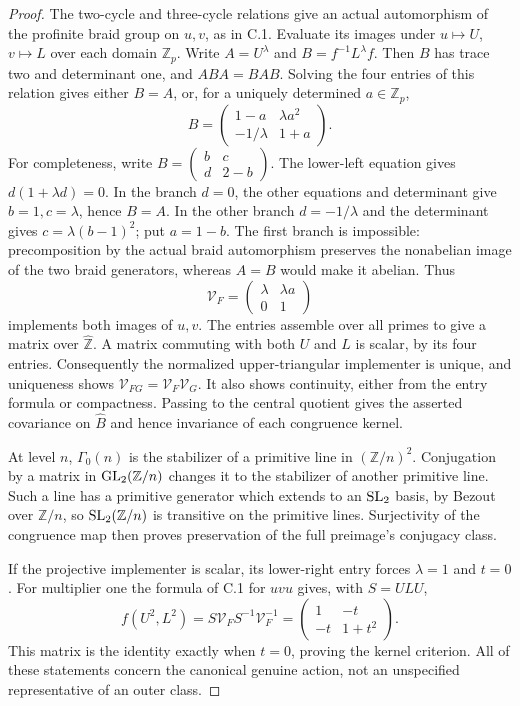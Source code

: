 \begin{proof}
The two-cycle and three-cycle relations give an actual automorphism
of the profinite braid group on $u,v$, as in C.1. Evaluate its
images under $u\mapsto U$, $v\mapsto L$ over each domain
$\mathbb Z_p$. Write $A=U^\lambda$ and $B=f^{-1}L^\lambda f$.
Then $B$ has trace two and determinant one, and $ABA=BAB$.
Solving the four entries of this relation gives either $B=A$,
or, for a uniquely determined $a\in\mathbb Z_p$,
\[
 B=\begin{pmatrix}1-a&\lambda a^2\\
                  -1/\lambda&1+a\end{pmatrix}.
\]
For completeness, write $B=\left(\begin{smallmatrix}b&c\\d&2-b\end{smallmatrix}\right)$.
The lower-left equation gives $d(1+\lambda d)=0$.
In the branch $d=0$, the other equations and determinant give
$b=1,c=\lambda$, hence $B=A$. In the other branch
$d=-1/\lambda$ and the determinant gives
$c=\lambda(b-1)^2$; put $a=1-b$.
The first branch is impossible: precomposition by the actual braid
automorphism preserves the nonabelian image of the two braid
generators, whereas $A=B$ would make it abelian. Thus
\[
 \mathcal V_F=\begin{pmatrix}\lambda&\lambda a\\0&1\end{pmatrix}
\]
implements both images of $u,v$. The entries assemble over all
primes to give a matrix over $\widehat{\mathbb Z}$. A matrix
commuting with both $U$ and $L$ is scalar, by its four entries.
Consequently the normalized upper-triangular implementer is unique,
and uniqueness shows $\mathcal V_{FG}=\mathcal V_F\mathcal V_G$.
It also shows continuity, either from the entry formula or compactness.
Passing to the central quotient gives the asserted covariance on
$\widehat B$ and hence invariance of each congruence kernel.

At level $n$, $\Gamma_0(n)$ is the stabilizer of a primitive line
in $(\mathbb Z/n)^2$. Conjugation by a matrix in $\operatorname{GL}_2(\mathbb Z/n)$
changes it to the stabilizer of another primitive line. Such a line
has a primitive generator which extends to an $\operatorname{SL}_2$ basis, by
Bezout over $\mathbb Z/n$, so $\operatorname{SL}_2(\mathbb Z/n)$ is transitive
on the primitive lines. Surjectivity of the congruence map then
proves preservation of the full preimage's conjugacy class.

If the projective implementer is scalar, its lower-right entry
forces $\lambda=1$ and $t=0$. For multiplier one the formula of
C.1 for $uvu$ gives, with $S=ULU$,
\[
 f(U^2,L^2)=S\mathcal V_F S^{-1}\mathcal V_F^{-1}
       =\begin{pmatrix}1&-t\\-t&1+t^2\end{pmatrix}.
\]
This matrix is the identity exactly when $t=0$, proving the kernel
criterion. All of these statements concern the canonical genuine
action, not an unspecified representative of an outer class.
\end{proof}

